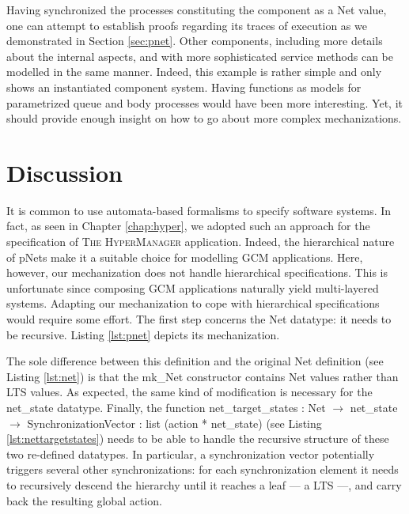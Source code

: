 	
	
		Having synchronized the processes constituting the component as a \textsf{Net} value,
		one can attempt to establish proofs regarding its traces of execution as we demonstrated in
		Section \ref{sec:pnet}. Other components, including more details about the internal 
		aspects, and with more sophisticated service methods can be modelled
		in the same manner. Indeed, this example is rather simple and only shows
		an instantiated component system. Having functions as models for parametrized
		queue and body processes would have been more interesting.		
		Yet, it should provide enough insight on how to go about more complex
		mechanizations.



\section{Discussion}
\label{sec:behaviourdiscussion}
	
	
	It is common to use automata-based formalisms to specify software systems. In fact,		
	as seen in Chapter \ref{chap:hyper}, we adopted such an approach for the specification
	of \textsc{The HyperManager} application. Indeed, the hierarchical nature of pNets
	make it a suitable choice for modelling \ac{GCM} applications. Here, however,
	our mechanization does not handle hierarchical specifications. This is unfortunate
	since composing \ac{GCM} applications naturally yield multi-layered systems.
	Adapting our mechanization to cope with hierarchical specifications would
	require some effort. The first step concerns the \textsf{Net} datatype: it
	needs to be recursive. Listing \ref{lst:pnet} depicts its mechanization.
	
		
						

	\noindent The sole difference between this definition and the original \textsf{Net}
	definition (see Listing \ref{lst:net}) is that the \textsf{mk\_Net} constructor
	contains \textsf{Net} values rather than \textsf{LTS} values. As expected, the same kind
	of modification is necessary for the \textsf{net\_state} datatype. Finally,
	the function 
	\textsf{net\_target\_states : Net $\rightarrow$ net\_state $\rightarrow$ SynchronizationVector : 
	list (action * net\_state)} (see Listing \ref{lst:nettargetstates}) 
	needs to be able to handle the recursive structure of these two
	re-defined datatypes. In particular, a synchronization vector potentially triggers 
	several other synchronizations: for each synchronization element it needs to recursively
	descend the hierarchy until it reaches a leaf --- a \textsf{LTS} ---, and carry back the 
	resulting global \textsf{action}. 
	

